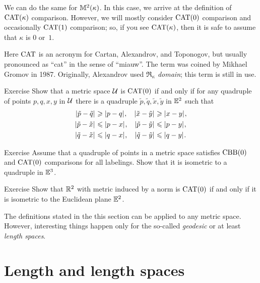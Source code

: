 We can do the same for $\mathbb{M}^2(\kappa)$.
In this case, we arrive at the definition of $\mathrm{CAT}(\kappa)$ comparison.
However, we will mostly consider $\mathrm{CAT}(0)$ comparison and occasionally $\mathrm{CAT}(1)$ comparison;
so, if you see $\mathrm{CAT}(\kappa)$, then it is safe to assume that $\kappa$ is $0$ or~$1$.

Here $\mathrm{CAT}$ is an acronym for Cartan, Alexandrov, and Toponogov,
but usually pronounced as ``cat'' in the sense of ``miauw''.
The term was coined by Mikhael Gromov in 1987.
Originally, Alexandrov used \emph{$\mathfrak{R}_\kappa$ domain};
this term is still in use.

\begin{thm}{Exercise}\label{ex:sba-2+2-short}
Show that a metric space $\mathcal{U}$ is $\mathrm{CAT}(0)$
if and only if for any quadruple of points 
$p,q,x,y$ in $\mathcal{U}$ 
there is a quadruple $\tilde p,\tilde q,\tilde x,\tilde y$ in $\mathbb{E}^2$
such that 
\begin{align*}
\dist{\tilde p}{\tilde q}{}&\ge\dist{p}{q}{},
&
\dist{\tilde x}{\tilde y}{}&\ge\dist{x}{y}{},
\\
\dist{\tilde p}{\tilde x}{}&\le \dist{p}{x}{},
&
\dist{\tilde p}{\tilde y}{}&\le \dist{p}{y}{},
\\
\dist{\tilde q}{\tilde x}{}&\le \dist{q}{x}{},
&
\dist{\tilde q}{\tilde y}{}&\le \dist{q}{y}{}.
\end{align*}

\end{thm}

\begin{thm}{Exercise}
Assume that a quadruple of points in a metric space satisfies $\mathrm{CBB}(0)$ and $\mathrm{CAT}(0)$ comparisons for all labelings.
Show that it is isometric to a quadruple in $\mathbb{E}^3$.
\end{thm}

\begin{thm}{Exercise}\label{ex:normCBB}
Show that $\mathbb{R}^2$ with metric induced by a norm is $\mathrm{CAT}(0)$ if and only if it is isometric to the Euclidean plane $\mathbb{E}^2$.
\end{thm}

The definitions stated in the this section can be applied to any metric space.
However, interesting things happen only for the so-called \textit{geodesic} or at least \textit{length spaces}.

\section{Length and length spaces}\label{sec:length}

